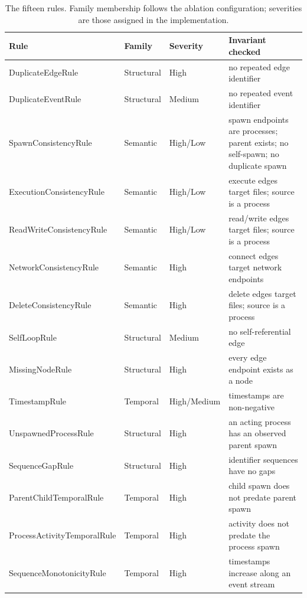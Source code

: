 \begin{table}[t]
\centering
\caption{The fifteen rules. Family membership follows the ablation configuration; severities are those assigned in the implementation.}
\label{tab:catalogue}
{\small
\begin{tabular}{p{4.2cm}p{1.5cm}p{1.9cm}p{5.6cm}}
\toprule
Rule & Family & Severity & Invariant checked \\
\midrule
DuplicateEdgeRule & Structural & High & no repeated edge identifier \\
DuplicateEventRule & Structural & Medium & no repeated event identifier \\
SpawnConsistencyRule & Semantic & High/Low & spawn endpoints are processes; parent exists; no self-spawn; no duplicate spawn \\
ExecutionConsistencyRule & Semantic & High/Low & execute edges target files; source is a process \\
ReadWriteConsistencyRule & Semantic & High/Low & read/write edges target files; source is a process \\
NetworkConsistencyRule & Semantic & High & connect edges target network endpoints \\
DeleteConsistencyRule & Semantic & High & delete edges target files; source is a process \\
SelfLoopRule & Structural & Medium & no self-referential edge \\
MissingNodeRule & Structural & High & every edge endpoint exists as a node \\
TimestampRule & Temporal & High/Medium & timestamps are non-negative \\
UnspawnedProcessRule & Structural & High & an acting process has an observed parent spawn \\
SequenceGapRule & Structural & High & identifier sequences have no gaps \\
ParentChildTemporalRule & Temporal & High & child spawn does not predate parent spawn \\
ProcessActivityTemporalRule & Temporal & High & activity does not predate the process spawn \\
SequenceMonotonicityRule & Temporal & High & timestamps increase along an event stream \\
\bottomrule
\end{tabular}
}
\end{table}
